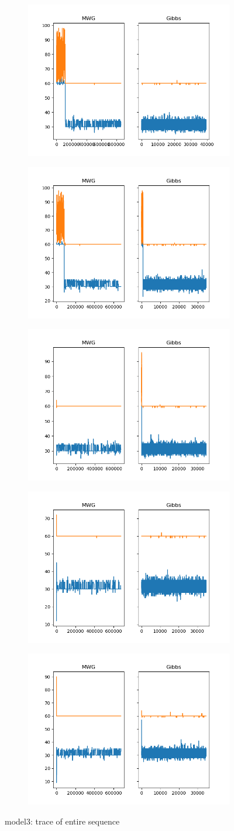 \begin{figure}[H]
    \centering
    \begin{subfigure}
    	\centering
        \includegraphics[width=0.3\linewidth]{../../plots/Trace_M3_N100_NMCMC3_seed0_diffind2.png}
    \end{subfigure}
    \begin{subfigure}
        \centering
    	\includegraphics[width=0.3\linewidth]{../../plots/Trace_M3_N100_NMCMC3_seed1_diffind2.png}
	\end{subfigure}
	\begin{subfigure}
	    \centering
    	\includegraphics[width=0.3\linewidth]{../../plots/Trace_M3_N100_NMCMC3_seed2_diffind2.png}
	\end{subfigure}
	\begin{subfigure}
	    \centering
    	\includegraphics[width=0.3\linewidth]{../../plots/Trace_M3_N100_NMCMC3_seed3_diffind2.png}
	\end{subfigure}
	\begin{subfigure}
	    \centering
    	\includegraphics[width=0.3\linewidth]{../../plots/Trace_M3_N100_NMCMC3_seed4_diffind2.png}
	\end{subfigure}
	\caption{model3: trace of entire sequence}
\end{figure}

